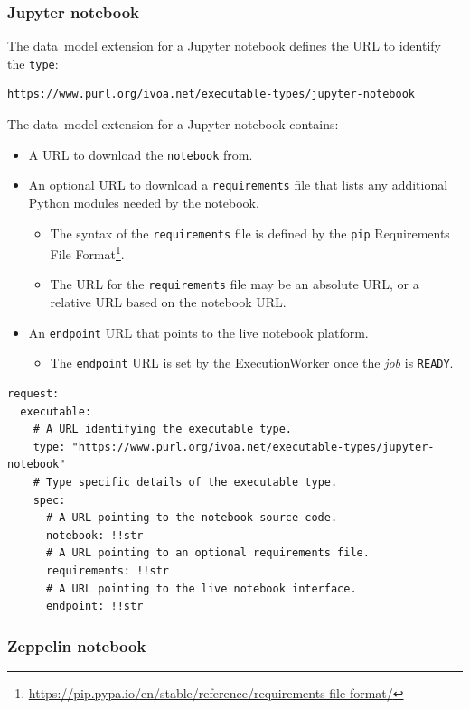 \documentclass[11pt,a4paper]{ivoa}
\newcommand{\datamodel} {data~model}
\newcommand{\execworkerclass} {ExecutionWorker}
\newcommand{\jupyternotebook} {Jupyter notebook}
\newcommand{\python} {Python}
\newcommand{\codeword}[1] {\texttt{#1}}
\newcommand{\footurl}[1] {\footnote{\url{#1}}}
\newcommand{\job} {\textit{job}}
\begin{document}
\subsubsection{Jupyter notebook}
\label{datamodel-jupyter-notebook}

The \datamodel{} extension for a \jupyternotebook{} defines the URL
to identify the \codeword{type}:
\begin{lstlisting}[]
https://www.purl.org/ivoa.net/executable-types/jupyter-notebook
\end{lstlisting}
\hfill \break
The \datamodel{} extension for a \jupyternotebook{} contains:
\begin{itemize}
    \item A URL to download the \codeword{notebook} from.
    \item An optional URL to download a \codeword{requirements} file that lists any additional
    \python{} modules needed by the notebook.
    \begin{itemize}
        \item The syntax of the \codeword{requirements} file is defined by the \codeword{pip}
        Requirements File Format\footurl{https://pip.pypa.io/en/stable/reference/requirements-file-format/}.
        \item The URL for the \codeword{requirements} file may be an absolute URL, or a relative URL based on the notebook URL.
    \end{itemize}
    \item An \codeword{endpoint} URL that points to the live notebook platform.
    \begin{itemize}
        \item The \codeword{endpoint} URL is set by the \execworkerclass{} once the \job{} is \codeword{READY}.
    \end{itemize}
\end{itemize}

\begin{lstlisting}[]
request:
  executable:
    # A URL identifying the executable type.
    type: "https://www.purl.org/ivoa.net/executable-types/jupyter-notebook"
    # Type specific details of the executable type.
    spec:
      # A URL pointing to the notebook source code.
      notebook: !!str
      # A URL pointing to an optional requirements file.
      requirements: !!str
      # A URL pointing to the live notebook interface.
      endpoint: !!str
\end{lstlisting}

\subsubsection{Zeppelin notebook}
\label{datamodel-zeppelin-notebook}
\end{document}

